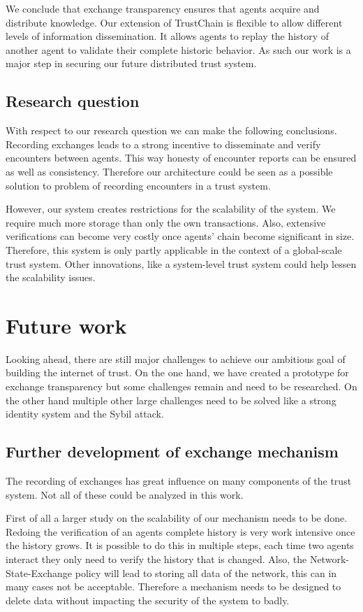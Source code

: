 We conclude that exchange transparency ensures that agents acquire and distribute knowledge. Our 
extension of TrustChain is flexible to allow different levels of information dissemination. It allows
agents to replay the history of another agent to validate their complete historic behavior. As such
our work is a major step in securing our future distributed trust system.

\subsection{Research question}
With respect to our research question we can make the following conclusions. Recording exchanges 
leads to a strong incentive to disseminate and verify encounters between agents. This way honesty
of encounter reports can be ensured as well as consistency. Therefore our architecture could be 
seen as a possible solution to problem of recording encounters in a trust system. 

However, our system creates restrictions for the scalability of the system. We require much more 
storage than only the own transactions. Also, extensive verifications can become very costly once 
agents' chain become significant in size. Therefore, this system is only partly applicable in the 
context of a global-scale trust system. Other innovations, like a system-level trust system could 
help lessen the scalability issues.

\section{Future work}
Looking ahead, there are still major challenges to achieve our ambitious goal of building the 
internet of trust. On the one hand, we have created a prototype for exchange transparency but some 
challenges remain and need to be researched. On the other hand multiple other large challenges need
to be solved like a strong identity system and the Sybil attack.

\subsection{Further development of exchange mechanism}
The recording of exchanges has great influence on many components of the trust system. Not all of 
these could be analyzed in this work. 

First of all a larger study on the scalability of our mechanism
needs to be done. Redoing the verification of an agents complete history is very work intensive once the 
history grows. It is possible to do this in multiple steps, each time two agents interact they only
need to verify the history that is changed. Also, the Network-State-Exchange policy will lead to 
storing all data of the network, this can in many cases not be acceptable. Therefore a mechanism 
needs to be designed to delete data without impacting the security of the system to badly. 

